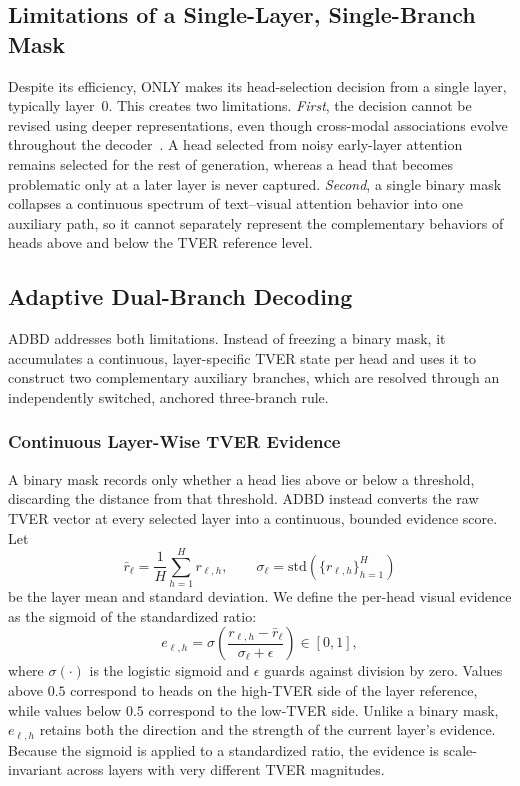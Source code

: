 \subsection{Limitations of a Single-Layer, Single-Branch Mask}

Despite its efficiency, ONLY makes its head-selection decision from a single layer, typically layer~0. This creates two limitations. \emph{First}, the decision cannot be revised using deeper representations, even though cross-modal associations evolve throughout the decoder~\cite{abnar2020quantifying,clark2019does}. A head selected from noisy early-layer attention remains selected for the rest of generation, whereas a head that becomes problematic only at a later layer is never captured. \emph{Second}, a single binary mask collapses a continuous spectrum of text--visual attention behavior into one auxiliary path, so it cannot separately represent the complementary behaviors of heads above and below the TVER reference level.

\subsection{Adaptive Dual-Branch Decoding}

ADBD addresses both limitations. Instead of freezing a binary mask, it accumulates a continuous, layer-specific TVER state per head and uses it to construct two complementary auxiliary branches, which are resolved through an independently switched, anchored three-branch rule.

\subsubsection{Continuous Layer-Wise TVER Evidence}

A binary mask records only whether a head lies above or below a threshold, discarding the distance from that threshold. ADBD instead converts the raw TVER vector at every selected layer into a continuous, bounded evidence score. Let
\begin{equation}
\bar{r}_{\ell} = \frac{1}{H}\sum_{h=1}^{H} r_{\ell,h}, \qquad \sigma_{\ell} = \mathrm{std}\!\left(\{r_{\ell,h}\}_{h=1}^{H}\right)
\end{equation}
be the layer mean and standard deviation. We define the per-head visual evidence as the sigmoid of the standardized ratio:
\begin{equation}
e_{\ell,h} = \sigma\!\left(\frac{r_{\ell,h} - \bar{r}_{\ell}}{\sigma_{\ell} + \epsilon}\right) \in [0,1],
\end{equation}
where $\sigma(\cdot)$ is the logistic sigmoid and $\epsilon$ guards against division by zero. Values above $0.5$ correspond to heads on the high-TVER side of the layer reference, while values below $0.5$ correspond to the low-TVER side. Unlike a binary mask, $e_{\ell,h}$ retains both the direction and the strength of the current layer's evidence. Because the sigmoid is applied to a standardized ratio, the evidence is scale-invariant across layers with very different TVER magnitudes.


